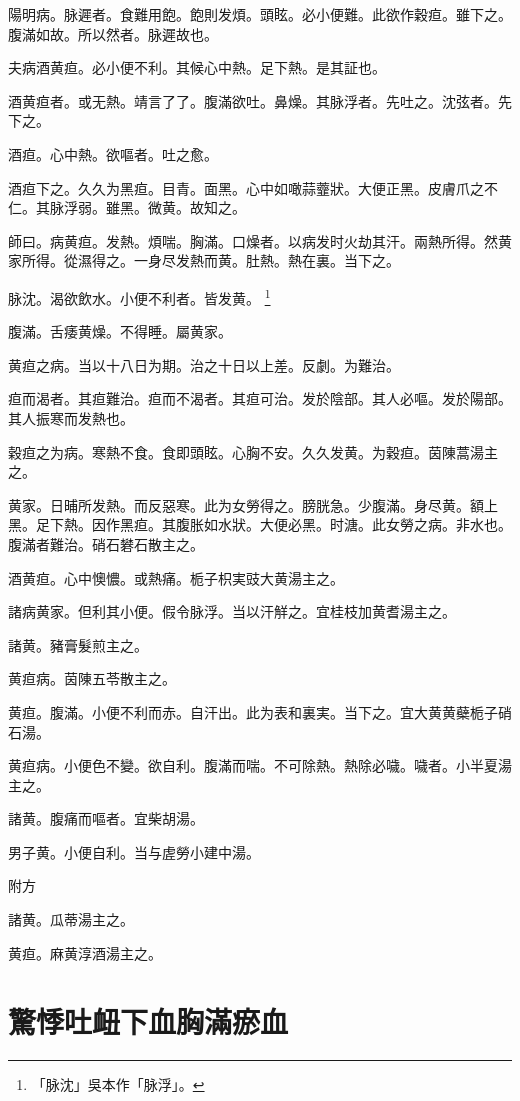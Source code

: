 \documentclass[12pt,twoside,UTF8,b5paper]{ctexbook}
\begin{document}
陽明病。脉遲者。食難用飽。飽則发煩。頭眩。必小便難。此欲作穀疸。雖下之。腹滿如故。所以然者。脉遲故也。

夫病酒黄疸。必小便不利。其候心中熱。足下熱。是其証也。

酒黄疸者。或无熱。靖言了{了}。腹滿欲吐。鼻燥。其脉浮者。先吐之。沈弦者。先下之。

酒疸。心中熱。欲嘔者。吐之愈。

酒疸下之。久久为黑疸。目青。面黑。心中如噉蒜虀狀。大便正黑。皮膚爪之不仁。其脉浮弱。雖黑。微黄。故知之。

師曰。病黄疸。发熱。煩喘。胸滿。口燥者。以病发时火劫其汗。兩熱所得。然黄家所得。從濕得之。一身尽发熱而黄。肚熱。熱在裏。当下之。

脉沈。渴欲飲水。小便不利者。皆发黄。
	\footnote{「脉沈」吳本作「脉浮」。}

腹滿。舌痿黄燥。不得睡。屬黄家。

黄疸之病。当以十八日为期。治之十日以上差。反劇。为難治。

疸而渴者。其疸難治。疸而不渴者。其疸可治。发於陰部。其人必嘔。{发於}陽部。其人振寒而发熱也。

穀疸之为病。寒熱不食。食即頭眩。心胸不安。久久发黄。为穀疸。茵陳蒿湯主之。

黄家。日晡所发熱。而反惡寒。此为女勞得之。膀胱急。少腹滿。身尽黄。額上黑。足下熱。因作黑疸。其腹胀如水狀。大便必黑。时溏。此女勞之病。非水也。腹滿者難治。硝石礬石散主之。

酒黄疸。心中懊憹。或熱痛。栀子{枳実豉}大黄湯主之。

諸病黄家。但利其小便。假令脉浮。当以汗觧之。宜桂枝加黄耆湯主之。

諸黄。豬膏髮煎主之。

黄疸病。茵陳五苓散主之。

黄疸。腹滿。小便不利而赤。自汗出。此为表和裏実。当下之。宜大黄{黄蘗栀子}硝石湯。

黄疸病。小便色不變。欲自利。腹滿而喘。不可除熱。熱除必噦。噦者。小半夏湯主之。

諸黄。腹痛而嘔者。宜柴胡湯。

男子黄。小便自利。当与虗勞小建中湯。

附方

諸黄。瓜蒂湯主之。

黄疸。麻黄淳酒湯主之。

\chapter{驚悸吐衄下血胸滿瘀血}
\end{document}
